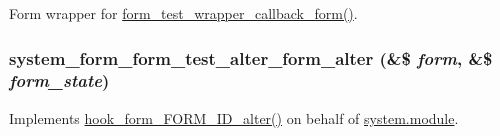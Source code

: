Form wrapper for \hyperlink{form__test_8module_ac8506013dd0135407072df7d9bccbc97}{form\_\-test\_\-wrapper\_\-callback\_\-form()}. \hypertarget{form__test_8module_a17e5292c04567982f20e046b897643a9}{
\subsubsection[{system\_\-form\_\-form\_\-test\_\-alter\_\-form\_\-alter}]{\setlength{\rightskip}{0pt plus 5cm}system\_\-form\_\-form\_\-test\_\-alter\_\-form\_\-alter (\&\$ {\em form}, \/  \&\$ {\em form\_\-state})}}
\label{form__test_8module_a17e5292c04567982f20e046b897643a9}
Implements \hyperlink{group__hooks_ga8d4a4089551493d55911bd5c4f218264}{hook\_\-form\_\-FORM\_\-ID\_\-alter()} on behalf of \hyperlink{system_8module}{system.module}. 